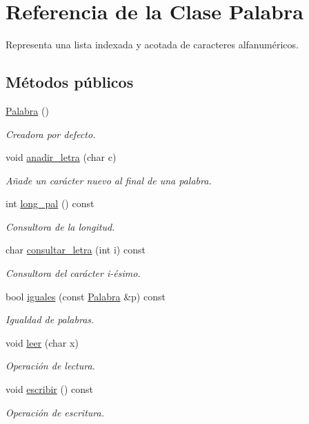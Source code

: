 \hypertarget{class_palabra}{\section{Referencia de la Clase Palabra}
\label{class_palabra}
}


Representa una lista indexada y acotada de caracteres alfanuméricos.  


\subsection*{Métodos públicos}
\begin{DoxyCompactItemize}
\item 
\hyperlink{class_palabra_a8e74f02e148cdcb5bb91bc2ae193183e}{Palabra} ()
\begin{DoxyCompactList}\small\item\em Creadora por defecto. \end{DoxyCompactList}\item 
void \hyperlink{class_palabra_af5ff11094169feb67dc7d367e91b346a}{anadir\-\_\-letra} (char c)
\begin{DoxyCompactList}\small\item\em Añade un carácter nuevo al final de una palabra. \end{DoxyCompactList}\item 
int \hyperlink{class_palabra_a12b9671d02253db0b9e99dd2ddd26588}{long\-\_\-pal} () const 
\begin{DoxyCompactList}\small\item\em Consultora de la longitud. \end{DoxyCompactList}\item 
char \hyperlink{class_palabra_af17b4fea06a303870ab726134908fa3d}{consultar\-\_\-letra} (int i) const 
\begin{DoxyCompactList}\small\item\em Consultora del carácter i-\/ésimo. \end{DoxyCompactList}\item 
bool \hyperlink{class_palabra_a15381207ba29efc2989acc0700423ae8}{iguales} (const \hyperlink{class_palabra}{Palabra} \&p) const 
\begin{DoxyCompactList}\small\item\em Igualdad de palabras. \end{DoxyCompactList}\item 
void \hyperlink{class_palabra_a03e3fef0cdcc99c9684f54b1492f94b0}{leer} (char x)
\begin{DoxyCompactList}\small\item\em Operación de lectura. \end{DoxyCompactList}\item 
void \hyperlink{class_palabra_ad7fd75761a05d47d9bdea8b440edf566}{escribir} () const 
\begin{DoxyCompactList}\small\item\em Operación de escritura. \end{DoxyCompactList}\end{DoxyCompactItemize}
